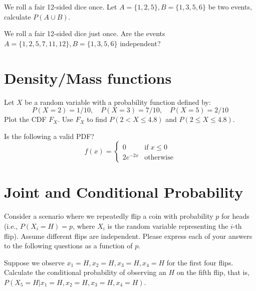 \documentclass[11pt]{article}
\begin{document}
\item {}
We roll a fair 12-sided dice once. Let $A= \{1,2,5\}, B = \{1,3,5,6\}$ be two events, calculate $P(A\cup B)$.
\ifnotsolution{\vspace{3cm}}


\item {} We roll a fair 12-sided dice just once. Are the events $A= \{1,2,5,7,11,12\}, B = \{1,3,5,6\}$ independent?
\ifnotsolution{\clearpage}


\clearpage
\ee




\section{Density/Mass functions }
\be
\item {} Let $X$ be a random variable with a probability function defined by:
\[
P(X = 2) = 1/10, \quad P(X = 3) = 7/10, \quad P(X = 5) = 2/10
\]
Plot the CDF $F_X$. Use $F_X$ to find $P(2 < X \leq 4.8)$ and $P(2 \leq X \leq 4.8)$.
\ifnotsolution{\vspace{7cm}}




\item {} Is the following a valid PDF?
\begin{equation}
  f(x) =
    \begin{cases}
      0 & \text{if} \; x \leq 0\\
      2e^{-2x} & \text{otherwise}
    \end{cases}       
\end{equation}
\ifnotsolution{\clearpage}



\ee



\section{Joint and Conditional Probability }
Consider a scenario where we repeatedly flip a coin with probability $p$ for heads (i.e., $P(X_i = H) = p$, where $X_i$ is the random variable representing the $i$-th flip). Assume different flips are independent. Please express each of your answers to the following questions as a function of $p$.
\be
\item {} Suppose we observe $x_1 = H, x_2 = H, x_3 = H, x_4 = H$ for the first four flips. Calculate the conditional probability of observing an $H$ on the fifth flip, that is, $P(X_5 = H \vert x_1 =H, x_2 =H, x_3 =H, x_4 =H)$. 
\ifnotsolution{\vspace{3cm}}
\end{document}
